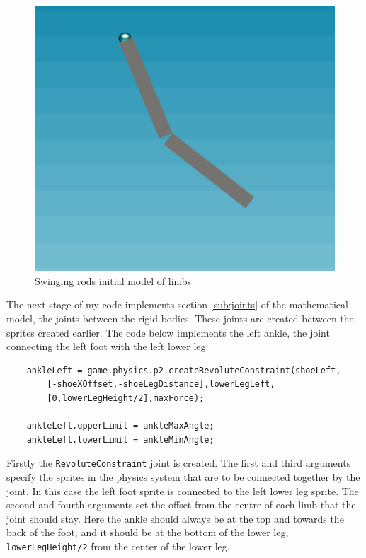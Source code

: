 \documentclass[12pt,a4paper,twoside,openright]{report}
\begin{document}
\begin{figure}[tbh]
\centerline{\includegraphics[scale=0.5]{swingingRods.PNG}}
\caption{Swinging rods initial model of limbs}
\label{swingingRods}
\end{figure}

The next stage of my code implements section \ref{sub:joints} of the mathematical model, the joints between the rigid bodies.
These joints are created between the sprites created earlier. The code below implements the left ankle, the joint connecting the left foot with the left lower leg:

\begin{displayquote}
	\begin{verbatim}
    ankleLeft = game.physics.p2.createRevoluteConstraint(shoeLeft,
        [-shoeXOffset,-shoeLegDistance],lowerLegLeft,
        [0,lowerLegHeight/2],maxForce);

    ankleLeft.upperLimit = ankleMaxAngle;
    ankleLeft.lowerLimit = ankleMinAngle;
    \end{verbatim}	
\end{displayquote}

Firstly the \texttt{RevoluteConstraint} joint is created. The first and third arguments specify the sprites in the physics system that are to be connected together by the joint. In this case the left foot sprite is connected to the left lower leg sprite. The second and fourth arguments set the offset from the centre of each limb that the joint should stay. Here the ankle should always be at the top and towards the back of the foot, and it should be at the bottom of the lower leg, \texttt{lowerLegHeight/2} from the center of the lower leg.
\end{document}

